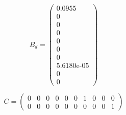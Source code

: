 
\medskip

\begin{equation}  \label{eq:Bd_full}
	B_d = \left(\begin{array}{c}
		0.0955\\
		0\\
		0\\
		0\\
		0\\
		0\\
		0\\
		\text{5.6180e-05}\\
		0\\
		0
	\end{array}\right)
\end{equation}

\begin{equation}  \label{eq:C_full}
	C = \left(\begin{array}{ccccccccccc}
		0 & 0 & 0 & 0 & 0 & 0 & 1 & 0 & 0 & 0 \\
		0 & 0 & 0 & 0 & 0 & 0 & 0 & 0 & 0 & 1
	\end{array}\right)
\end{equation}

